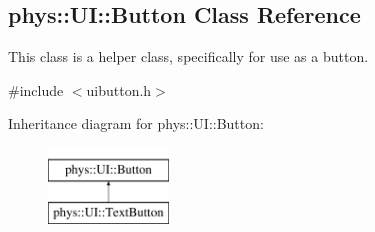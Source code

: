 \hypertarget{classphys_1_1UI_1_1Button}{
\subsection{phys::UI::Button Class Reference}
\label{d8/d88/classphys_1_1UI_1_1Button}
}


This class is a helper class, specifically for use as a button.  




{\ttfamily \#include $<$uibutton.h$>$}

Inheritance diagram for phys::UI::Button:\begin{figure}[H]
\begin{center}
\leavevmode
\includegraphics[height=2.000000cm]{d8/d88/classphys_1_1UI_1_1Button}
\end{center}
\end{figure}
